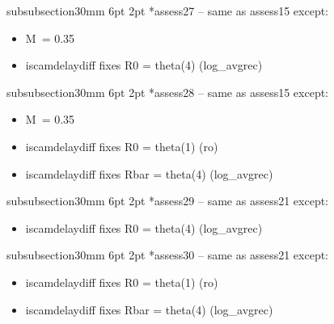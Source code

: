 \documentclass[11pt]{book}
\makeatletter
\renewcommand{\section}{\@startsection{section}{1}{0mm}%
{-18pt \@plus -0pt \@minus -0pt}{6pt \@plus 0pt}%
{\normalfont\large\bfseries\color{blue}\MakeUppercase}}%
\renewcommand{\subsubsection}{\@startsection%
{subsubsection}{3}{0mm}%
{6pt \@plus -0pt \@minus -0pt}{2pt \@plus 0pt}%
{\normalfont\bf}}%
\makeatother
\begin{document}
\subsubsection*{assess27 -- same as assess15 except:}
\begin{itemize}[nosep]
  \item M~= 0.35
  \item iscamdelaydiff fixes R0 = theta(4) (log\_avgrec)
\end{itemize}

\subsubsection*{assess28 -- same as assess15 except:}
\begin{itemize}[nosep]
  \item M~= 0.35
  \item iscamdelaydiff fixes R0 = theta(1) (ro)
  \item iscamdelaydiff fixes Rbar = theta(4) (log\_avgrec)
\end{itemize}

\subsubsection*{assess29 -- same as assess21 except:}
\begin{itemize}[nosep]
  \item iscamdelaydiff fixes R0 = theta(4) (log\_avgrec)
\end{itemize}

\subsubsection*{assess30 -- same as assess21 except:}
\begin{itemize}[nosep]
  \item iscamdelaydiff fixes R0   = theta(1) (ro)
  \item iscamdelaydiff fixes Rbar = theta(4) (log\_avgrec)
\end{itemize}




\end{document}
